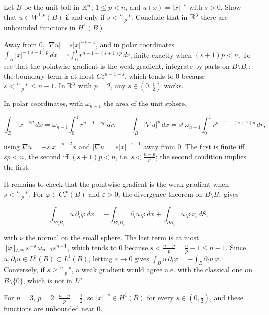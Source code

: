 \begin{exercise}
  Let $B$ be the unit ball in $\mathbb{R}^n$, $1 \le p < n$, and $u(x) = |x|^{-s}$ with $s > 0$. Show that $u \in W^{1,p}(B)$ if and only if $s < \frac{n-p}{p}$. Conclude that in $\mathbb{R}^3$ there are unbounded functions in $H^1(B)$.
  \begin{hint}
    Away from $0$, $|\nabla u| = s|x|^{-s-1}$, and in polar coordinates $\int_B |x|^{-(s+1)p}\,dx = c\int_0^1 r^{n-1-(s+1)p}\,dr$, finite exactly when $(s+1)p < n$. To see that the pointwise gradient is the weak gradient, integrate by parts on $B\setminus B_\varepsilon$: the boundary term is at most $C\varepsilon^{n-1-s}$, which tends to $0$ because $s < \frac{n-p}{p} \le n-1$. In $\mathbb{R}^3$ with $p = 2$, any $s \in (0,\frac12)$ works.
  \end{hint}
  \begin{solution}
    In polar coordinates, with $\omega_{n-1}$ the area of the unit sphere,

    \[ \int_B |x|^{-sp}\,dx = \omega_{n-1}\int_0^1 r^{n-1-sp}\,dr, \qquad \int_B |\nabla u|^p\,dx = s^p\omega_{n-1}\int_0^1 r^{n-1-(s+1)p}\,dr, \]

    using $\nabla u = -s|x|^{-s-2}x$ and $|\nabla u| = s|x|^{-s-1}$ away from $0$. The first is finite iff $sp < n$, the second iff $(s+1)p < n$, i.e. $s < \frac{n-p}{p}$; the second condition implies the first.

    It remains to check that the pointwise gradient is the weak gradient when $s < \frac{n-p}{p}$. For $\varphi \in C_c^\infty(B)$ and $\varepsilon > 0$, the divergence theorem on $B\setminus B_\varepsilon$ gives

    \[ \int_{B\setminus B_\varepsilon} u\,\partial_i\varphi\,dx = -\int_{B\setminus B_\varepsilon}\partial_iu\,\varphi\,dx + \int_{\partial B_\varepsilon} u\,\varphi\,\nu_i\,dS, \]

    with $\nu$ the normal on the small sphere. The last term is at most $\left\lVert \varphi\right\rVert_{L^\infty}\varepsilon^{-s}\,\omega_{n-1}\varepsilon^{n-1}$, which tends to $0$ because $s < \frac{n-p}{p} = \frac np - 1 \le n-1$. Since $u, \partial_iu \in L^p(B) \subset L^1(B)$, letting $\varepsilon \to 0$ gives $\int_B u\,\partial_i\varphi = -\int_B \partial_iu\,\varphi$. Conversely, if $s \ge \frac{n-p}{p}$, a weak gradient would agree a.e. with the classical one on $B\setminus\{0\}$, which is not in $L^p$.

    For $n = 3$, $p = 2$: $\frac{n-p}{p} = \frac12$, so $|x|^{-s} \in H^1(B)$ for every $s \in (0,\frac12)$, and these functions are unbounded near $0$.
  \end{solution}
\end{exercise}

